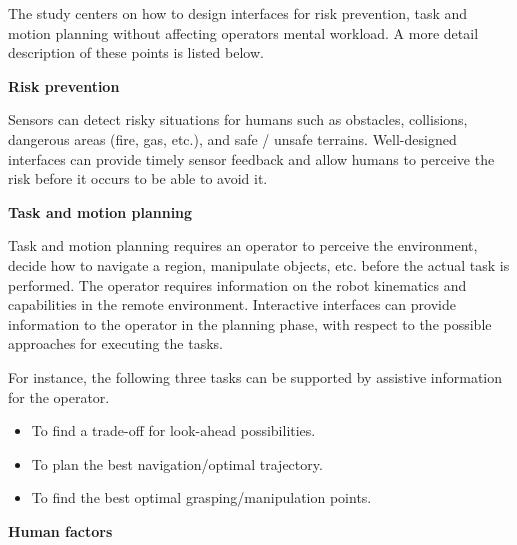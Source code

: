 The study centers on how to design interfaces for risk prevention, task and motion planning without affecting operators mental workload. A more detail description of these points is listed below. 

\textbf{Risk prevention}

Sensors can detect risky situations for humans such as obstacles, collisions, dangerous areas (fire, gas, etc.), and safe / unsafe terrains. Well-designed interfaces can provide timely sensor feedback and allow humans to perceive the risk before it occurs to be able to avoid it.


\textbf{Task and motion planning}

Task and motion planning requires an operator to perceive the environment, decide how to navigate a region, manipulate objects, etc. before the actual task is performed. The operator requires information on the robot kinematics and capabilities in the remote environment. Interactive interfaces can provide information to the operator in the planning phase, with respect to the possible approaches for executing the tasks.

For instance, the following three tasks can be supported by assistive information for the operator.
\begin{itemize}
    \item To find a trade-off for look-ahead possibilities.
    \item To plan the best navigation/optimal trajectory.
    \item To find the best optimal grasping/manipulation points.
\end{itemize}

\textbf{Human factors}


